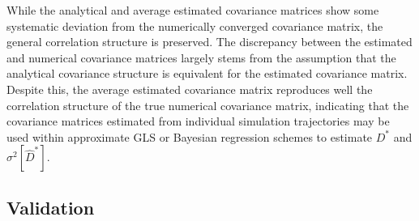 \documentclass[reprint,superscriptaddress,nobibnotes,amsmath,amssymb,aps,prx,hidelinks,linenumbers]{revtex4-2}
\newcommand{\oMSDi}{\ensuremath{x_i}}
\newcommand{\oMSDj}{\ensuremath{x_j}}
\newcommand{\Dest}{\ensuremath{\widehat{D}^*}}
\newcommand{\D}{\ensuremath{D^*}}
\newcommand{\var}[1]{\ensuremath{\sigma^2[#1]}}
\begin{document}

While the analytical and average estimated covariance matrices show some systematic deviation from the numerically converged covariance matrix, the general correlation structure is preserved.
The discrepancy between the estimated and numerical covariance matrices largely stems from the assumption that the analytical covariance structure is equivalent for the estimated covariance matrix. 
Despite this, the average estimated covariance matrix reproduces well the correlation structure of the true numerical covariance matrix, indicating that the covariance matrices estimated from individual simulation trajectories may be used within approximate GLS or Bayesian regression schemes to estimate $\D$ and $\var{\Dest}$.

\subsection{Validation}
\end{document}
